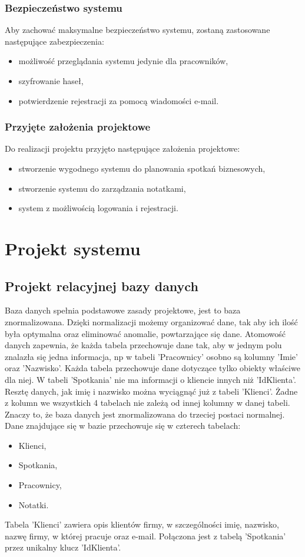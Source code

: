 \documentclass[eng,printmode,openany,oneside]{mgr}
\begin{document}
\subsection*{Bezpieczeństwo systemu}
Aby zachować maksymalne bezpieczeństwo systemu, zostaną zastosowane następujące zabezpieczenia: 
\begin{itemize}
	\item możliwość przeglądania systemu jedynie dla pracowników,
	\item szyfrowanie haseł,
	\item potwierdzenie rejestracji za pomocą wiadomości e-mail.
\end{itemize}

\subsection*{Przyjęte założenia projektowe}
Do realizacji projektu przyjęto następujące założenia projektowe:
\begin{itemize}
	\item stworzenie wygodnego systemu do planowania spotkań biznesowych,
	\item stworzenie systemu do zarządzania notatkami,
	\item system z możliwością logowania i rejestracji.
\end{itemize}

\chapter{Projekt systemu}
\section{Projekt relacyjnej bazy danych}

Baza danych spełnia podstawowe zasady projektowe, jest to baza znormalizowana. Dzięki normalizacji możemy organizować dane, tak aby ich ilość była optymalna oraz eliminować anomalie, powtarzające się dane. Atomowość danych zapewnia, że każda tabela przechowuje dane tak, aby w jednym polu znalazła się jedna informacja, np w tabeli 'Pracownicy' osobno są kolumny 'Imie' oraz 'Nazwisko'. Każda tabela przechowuje dane dotyczące tylko obiekty właściwe dla niej. W tabeli 'Spotkania' nie ma informacji o kliencie innych niż 'IdKlienta'. Resztę danych, jak imię i nazwisko można wyciągnąć już z tabeli 'Klienci'. Żadne z kolumn we wszystkich 4 tabelach nie zależą od innej kolumny w danej tabeli. Znaczy to, że baza danych jest znormalizowana do trzeciej postaci normalnej. Dane znajdujące się w bazie przechowuje się w czterech tabelach:
\begin{itemize}
	\item Klienci,
	\item Spotkania,
	\item Pracownicy,
	\item Notatki.
\end{itemize}
Tabela 'Klienci' zawiera opis klientów firmy, w szczególności imię, nazwisko, nazwę firmy, w której pracuje oraz e-mail. Połączona jest z tabelą 'Spotkania' przez unikalny klucz 'IdKlienta'. 
\end{document}
